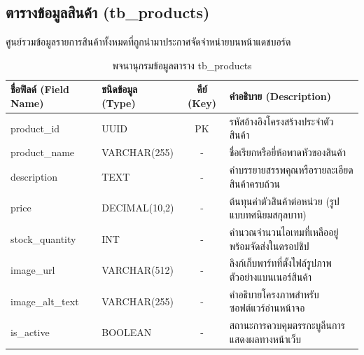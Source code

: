 \subsection{ตารางข้อมูลสินค้า (tb\_products)}
ศูนย์รวมข้อมูลรายการสินค้าทั้งหมดที่ถูกนำมาประกาศจัดจำหน่ายบนหน้าแดชบอร์ด
\begin{table}[h!]
\centering
\caption{พจนานุกรมข้อมูลตาราง tb\_products}
\vspace{0.2cm}
\begin{tabular}{|l|l|c|l|}
\hline
\textbf{ชื่อฟิลด์ (Field Name)} & \textbf{ชนิดข้อมูล (Type)} & \textbf{คีย์ (Key)} & \textbf{คำอธิบาย (Description)} \\ \hline
product\_id & UUID & PK & รหัสอ้างอิงโครงสร้างประจำตัวสินค้า \\ \hline
product\_name & VARCHAR(255) & - & ชื่อเรียกหรือยี่ห้อพาดหัวของสินค้า \\ \hline
description & TEXT & - & คำบรรยายสรรพคุณหรือรายละเอียดสินค้าครบถ้วน \\ \hline
price & DECIMAL(10,2) & - & ต้นทุนค่าตัวสินค้าต่อหน่วย (รูปแบบทศนิยมสกุลบาท) \\ \hline
stock\_quantity & INT & - & คำนวณจำนวนไอเทมที่เหลืออยู่พร้อมจัดส่งในดรอปชิป \\ \hline
image\_url & VARCHAR(512) & - & ลิงก์เก็บพาร์ทที่ตั้งไฟล์รูปภาพตัวอย่างแบนเนอร์สินค้า \\ \hline
image\_alt\_text & VARCHAR(255) & - & คำอธิบายโครงภาพสำหรับซอฟต์แวร์อ่านหน้าจอ \cite{wcag2023} \\ \hline
is\_active & BOOLEAN & - & สถานะการควบคุมตรรกะบูลีนการแสดงผลทางหน้าเว็บ \\ \hline
\end{tabular}
\end{table}


